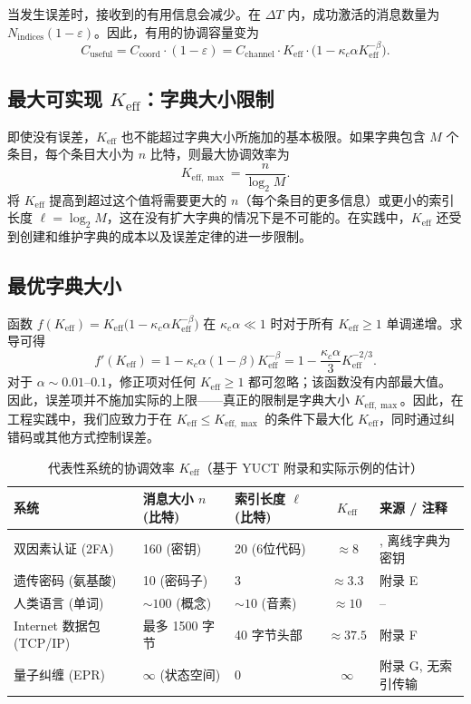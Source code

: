 \documentclass[12pt,a4paper]{article}
\theoremstyle{remark}
\newcommand{\Keff}{K_{\mathrm{eff}}}
\newcommand{\Keffmax}{K_{\mathrm{eff},\max}}
\begin{document}
	当发生误差时，接收到的有用信息会减少。在 $\Delta T$ 内，成功激活的消息数量为 $N_{\text{indices}}(1 - \varepsilon)$。因此，有用的协调容量变为
	\begin{equation}
		C_{\text{useful}} = C_{\text{coord}} \cdot (1 - \varepsilon) = C_{\text{channel}} \cdot \Keff \cdot \bigl(1 - \kappa_c \alpha K_{\mathrm{eff}}^{-\beta}\bigr).
		\label{eq:useful-rate}
	\end{equation}
	
	\subsection{最大可实现 $\Keff$：字典大小限制}
	
	即使没有误差，$\Keff$ 也不能超过字典大小所施加的基本极限。如果字典包含 $M$ 个条目，每个条目大小为 $n$ 比特，则最大协调效率为
	\begin{equation}
		\Keffmax = \frac{n}{\log_2 M}. \label{eq:keff-max}
	\end{equation}
	将 $\Keff$ 提高到超过这个值将需要更大的 $n$（每个条目的更多信息）或更小的索引长度 $\ell = \log_2 M$，这在没有扩大字典的情况下是不可能的。在实践中，$\Keff$ 还受到创建和维护字典的成本以及误差定律的进一步限制。
	
	\subsection{最优字典大小}
	
	函数 $f(\Keff) = \Keff \bigl(1 - \kappa_c \alpha K_{\mathrm{eff}}^{-\beta}\bigr)$ 在 $\kappa_c\alpha \ll 1$ 时对于所有 $\Keff \ge 1$ 单调递增。求导可得
	\[
	f'(\Keff) = 1 - \kappa_c\alpha(1-\beta)K_{\mathrm{eff}}^{-\beta} = 1 - \frac{\kappa_c\alpha}{3} K_{\mathrm{eff}}^{-2/3}.
	\]
	对于 $\alpha \sim 0.01$–$0.1$，修正项对任何 $\Keff \ge 1$ 都可忽略；该函数没有内部最大值。因此，误差项并不施加实际的上限——真正的限制是字典大小 $\Keffmax$。因此，在工程实践中，我们应致力于在 $\Keff \le \Keffmax$ 的条件下最大化 $\Keff$，同时通过纠错码或其他方式控制误差。
	
	\begin{table}[htbp]
		\centering
		\caption{代表性系统的协调效率 $\Keff$（基于 YUCT 附录和实际示例的估计）}
		\label{tab:keff-examples}
		\footnotesize
		\begin{tabularx}{\textwidth}{XXXcX}
			\toprule
			系统 & 消息大小 $n$ (比特) & 索引长度 $\ell$ (比特) & $\Keff$ & 来源 / 注释 \\
			\midrule
			双因素认证 (2FA) & 160 (密钥) & 20 (6位代码) & $\approx 8$ & \cite{Yakushev2026b}, 离线字典为密钥 \\
			遗传密码 (氨基酸) & 10 (密码子) & 3 & $\approx 3.3$ & 附录 E \\
			人类语言 (单词) & $\sim 100$ (概念) & $\sim 10$ (音素) & $\approx 10$ & – \\
			Internet 数据包 (TCP/IP) & 最多 1500 字节 & 40 字节头部 & $\approx 37.5$ & 附录 F \\
			量子纠缠 (EPR) & $\infty$ (状态空间) & 0 & $\infty$ & 附录 G, 无索引传输 \\
			\bottomrule
		\end{tabularx}
	\end{table}
	
\end{document}
